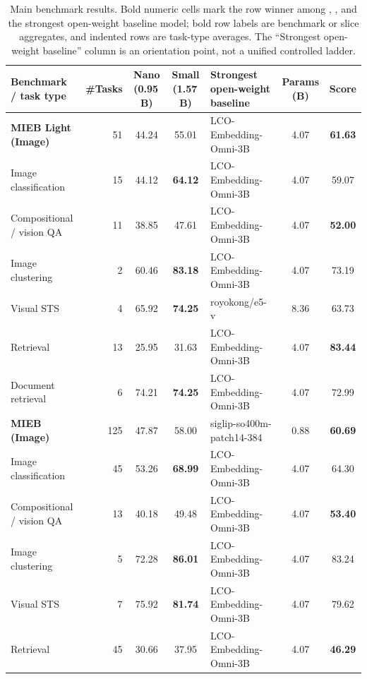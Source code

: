 \begin{table}[t]
  \caption{Main benchmark results.
  Bold numeric cells mark the row winner among \omniNano{}, \omniSmall{}, and the strongest open-weight baseline model; bold row labels are benchmark or slice aggregates, and indented rows are task-type averages.
  The ``Strongest open-weight baseline'' column is an orientation point, not a unified controlled ladder.}
  \label{tab:benchmark-summary}
  \centering
  \small
  \setlength{\tabcolsep}{2pt}
  \begin{tabular}{@{}L{0.255\textwidth}rccL{0.245\textwidth}cc@{}}
    \toprule
    Benchmark / task type & \#Tasks & Nano (0.95\,B) & Small (1.57\,B) & Strongest open-weight baseline & Params (B) & Score \\
    \midrule
    \textbf{MIEB Light (Image)} & 51  & 44.24 & 55.01 & LCO-Embedding-Omni-3B & 4.07 & \textbf{61.63} \\
    \quad Image classification & 15 & 44.12 & \textbf{64.12} & LCO-Embedding-Omni-3B & 4.07 & 59.07 \\
    \quad Compositional / vision QA & 11 & 38.85 & 47.61 & LCO-Embedding-Omni-3B & 4.07 & \textbf{52.00} \\
    \quad Image clustering & 2 & 60.46 & \textbf{83.18} & LCO-Embedding-Omni-3B & 4.07 & 73.19 \\
    \quad Visual STS & 4 & 65.92 & \textbf{74.25} & royokong/e5-v & 8.36 & 63.73 \\
    \quad Retrieval & 13 & 25.95 & 31.63 & LCO-Embedding-Omni-3B & 4.07 & \textbf{83.44} \\
    \quad Document retrieval & 6 & 74.21 & \textbf{74.25} & LCO-Embedding-Omni-3B & 4.07 & 72.99 \\
    \midrule
    \textbf{MIEB (Image)} & 125 & 47.87 & 58.00 & siglip-so400m-patch14-384 & 0.88 & \textbf{60.69} \\
    \quad Image classification & 45 & 53.26 & \textbf{68.99} & LCO-Embedding-Omni-3B & 4.07 & 64.30 \\
    \quad Compositional / vision QA & 13 & 40.18 & 49.48 & LCO-Embedding-Omni-3B & 4.07 & \textbf{53.40} \\
    \quad Image clustering & 5 & 72.28 & \textbf{86.01} & LCO-Embedding-Omni-3B & 4.07 & 83.24 \\
    \quad Visual STS & 7 & 75.92 & \textbf{81.74} & LCO-Embedding-Omni-3B & 4.07 & 79.62 \\
    \quad Retrieval & 45 & 30.66 & 37.95 & LCO-Embedding-Omni-3B & 4.07 & \textbf{46.29} \\

\end{tabular}
\end{table}

